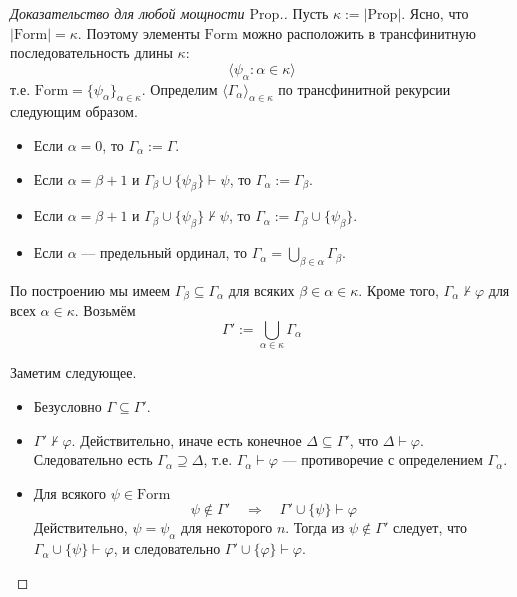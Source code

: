 \documentclass[12pt,a4paper]{article}
\newcommand{\Prop}{\ensuremath{\mathrm{Prop}}\xspace}
\newcommand{\Formul}{\ensuremath{\mathrm{Form}}\xspace}
\begin{document}
    \begin{proof}[Доказательство для любой мощности $\Prop$.]
        Пусть $\kappa := |\Prop|$. Ясно, что $|\Formul| = \kappa$. Поэтому элементы $\Formul$ можно расположить в трансфинитную последовательность длины $\kappa$:
        \[\langle \psi_\alpha: \alpha \in \kappa\rangle\]
        т.е. $\Formul = \{\psi_\alpha\}_{\alpha \in \kappa}$. Определим $\langle \Gamma_\alpha \rangle_{\alpha \in \kappa}$ по трансфинитной рекурсии следующим образом.
        \begin{itemize}
            \item Если $\alpha = 0$, то $\Gamma_\alpha := \Gamma$.
            \item Если $\alpha = \beta + 1$ и $\Gamma_\beta \cup \{\psi_\beta\} \vdash \psi$, то $\Gamma_\alpha := \Gamma_\beta$.
            \item Если $\alpha = \beta + 1$ и $\Gamma_\beta \cup \{\psi_\beta\} \nvdash \psi$, то $\Gamma_\alpha := \Gamma_\beta \cup \{\psi_\beta\}$.
            \item Если $\alpha$ --- предельный ординал, то $\Gamma_\alpha = \bigcup_{\beta \in \alpha} \Gamma_\beta$.
        \end{itemize}
        По построению мы имеем $\Gamma_\beta \subseteq \Gamma_\alpha$ для всяких $\beta \in \alpha \in \kappa$. Кроме того, $\Gamma_\alpha \nvdash \varphi$ для всех $\alpha \in \kappa$. Возьмём
        \[\Gamma' := \bigcup_{\alpha \in \kappa} \Gamma_\alpha\]

        Заметим следующее.
        \begin{itemize}
            \item Безусловно $\Gamma \subseteq \Gamma'$.
            \item $\Gamma' \nvdash \varphi$. Действительно, иначе есть конечное $\Delta \subseteq \Gamma'$, что $\Delta \vdash \varphi$. Следовательно есть $\Gamma_\alpha \supseteq \Delta$, т.е. $\Gamma_\alpha \vdash \varphi$ --- противоречие с определением $\Gamma_\alpha$.
            \item Для всякого $\psi \in \Formul$
                \[\psi \notin \Gamma' \quad \Longrightarrow \quad \Gamma' \cup \{\psi\} \vdash \varphi\]
                Действительно, $\psi = \psi_\alpha$ для некоторого $n$. Тогда из $\psi \notin \Gamma'$ следует, что $\Gamma_\alpha \cup \{\psi\} \vdash \varphi$, и следовательно $\Gamma' \cup \{\varphi\} \vdash \varphi$.
        \end{itemize}


\end{proof}
\end{document}
